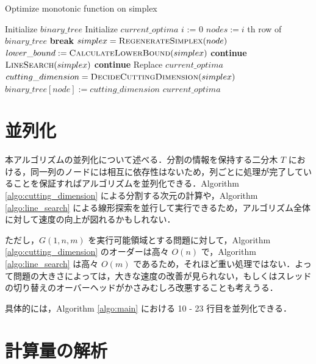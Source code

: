 \documentclass[a4paper,11pt]{jreport}
\newcommand{\Continue}{\State \textbf{continue} }
\newcommand{\Break}{\State \textbf{break} }
\begin{document}
\begin{algorithm}
\caption{Optimize monotonic function on simplex}
\label{algo:main}
\begin{algorithmic}[1]
\State Initialize $ binary\_tree $
\State Initialize $ current\_optima $
\State $ i $ := 0
\State $ nodes := i $ th row of $ binary\_tree $
\Break
\EndIf
{}
\State $ simplex = \Call{RegenerateSimplex}{node} $
\State $ lower\_bound := \Call{CalculateLowerBound}{simplex} $
\Continue
\EndIf
{}
\State $ \Call{LineSearch}{simplex} $
\Continue
\EndIf
{}
\State Replace $ current\_optima $
\EndIf
\State $ cutting\_dimension = \Call{DecideCuttingDimension}{simplex} $
\State $ binary\_tree[node] := cutting\_dimension $
\EndFor
\EndWhile
\State \Return $ current\_optima $
\end{algorithmic}
\end{algorithm}

\section{並列化}

本アルゴリズムの並列化について述べる．分割の情報を保持する二分木 $ T $ における，同一列のノードには相互に依存性はないため，列ごとに処理が完了していることを保証すればアルゴリズムを並列化できる．Algorithm \ref{algo:cutting_dimension} による分割する次元の計算や，Algorithm \ref{algo:line_search} による線形探索を並行して実行できるため，アルゴリズム全体に対して速度の向上が図れるかもしれない．\par
ただし，$ G(1, n, m) $ を実行可能領域とする問題に対して，Algorithm \ref{algo:cutting_dimension} のオーダーは高々 $ O(n) $ で，Algorithm \ref{algo:line_search} は高々 $ O(m) $ であるため，それほど重い処理ではない．よって問題の大きさによっては，大きな速度の改善が見られない，もしくはスレッドの切り替えのオーバーヘッドがかさみむしろ改悪することも考えうる．\par
具体的には，Algorithm \ref{algo:main} における 10 - 23 行目を並列化できる．

\section{計算量の解析}
\end{document}
